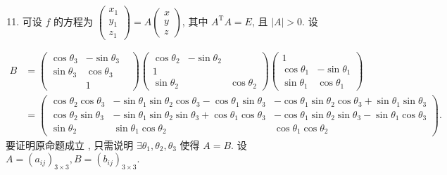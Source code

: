 \documentclass[10pt]{article}
\begin{document}
\begin{enumerate}
  \setcounter{enumi}{10}
  \item  可设  $f$  的方程为  $\left(\begin{array}{l}x_{1} \\ y_{1} \\ z_{1}\end{array}\right)=A\left(\begin{array}{l}x \\ y \\ z\end{array}\right)$,  其中  $A^{\mathrm{T}} A=E$,  且  $|A|>0$.  设 
\end{enumerate}
$$
\begin{aligned}
B &=\left(\begin{array}{ccc}
\cos \theta_{3} & -\sin \theta_{3} & \\
\sin \theta_{3} & \cos \theta_{3} & \\
& 1
\end{array}\right)\left(\begin{array}{ccc}
\cos \theta_{2} & -\sin \theta_{2} \\
1 & \\
\sin \theta_{2} & & \cos \theta_{2}
\end{array}\right)\left(\begin{array}{ccc}
1 & \\
\cos \theta_{1} & -\sin \theta_{1} \\
\sin \theta_{1} & \cos \theta_{1}
\end{array}\right) \\
&=\left(\begin{array}{ccc}
\cos \theta_{2} \cos \theta_{3} & -\sin \theta_{1} \sin \theta_{2} \cos \theta_{3}-\cos \theta_{1} \sin \theta_{3} & -\cos \theta_{1} \sin \theta_{2} \cos \theta_{3}+\sin \theta_{1} \sin \theta_{3} \\
\cos \theta_{2} \sin \theta_{3} & -\sin \theta_{1} \sin \theta_{2} \sin \theta_{3}+\cos \theta_{1} \cos \theta_{3} & -\cos \theta_{1} \sin \theta_{2} \sin \theta_{3}-\sin \theta_{1} \cos \theta_{3} \\
\sin \theta_{2} & \sin \theta_{1} \cos \theta_{2} & \cos \theta_{1} \cos \theta_{2}
\end{array}\right) .
\end{aligned}
$$
 要证明原命题成立 ,  只需说明  $\exists \theta_{1}, \theta_{2}, \theta_{3}$  使得  $A=B$.  设  $A=\left(a_{i j}\right)_{3 \times 3}, B=\left(b_{i j}\right)_{3 \times 3}$.
\end{document}
